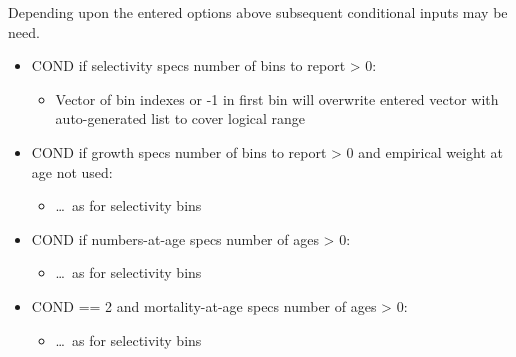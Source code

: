 Depending upon the entered options above subsequent conditional inputs may be need.
\begin{itemize}
	\item COND if selectivity specs number of bins to report > 0:
		\begin{itemize}
			\item Vector of bin indexes or -1 in first bin will overwrite entered vector with auto-generated list to cover logical range
	\end{itemize}
	\item COND if growth specs number of bins to report > 0 and empirical weight at age not used:
		\begin{itemize}
			\item \ldots~as for selectivity bins
		\end{itemize}
	\item COND if numbers-at-age specs number of ages > 0:
		\begin{itemize}
			\item \ldots~as for selectivity bins
		\end{itemize}
	\item COND == 2 and mortality-at-age specs number of ages > 0:
		\begin{itemize}
			\item \ldots~as for selectivity bins
		\end{itemize}
\end{itemize}

